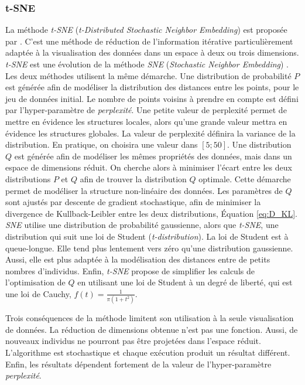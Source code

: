 \subsubsection{t-SNE} \label{subsubsec:tsne}
La méthode \textit{t-SNE} (\textit{t-Distributed Stochastic Neighbor Embedding}) est proposée par \citeauthor{maaten_visualizing_2008} \cite{maaten_visualizing_2008}. C'est une méthode de réduction de l'information itérative particulièrement adaptée à la visualisation des données dans un espace à deux ou trois dimensions.
\textit{t-SNE} est une évolution de la méthode \textit{SNE} (\textit{Stochastic Neighbor Embedding}) \cite{hinton_stochastic_2003}.
Les deux méthodes utilisent la même démarche.
Une distribution de probabilité $P$ est générée afin de modéliser la distribution des distances entre les points, pour le jeu de données initial.
Le nombre de points voisins à prendre en compte est défini par l'hyper-paramètre de \textit{perplexité}.
Une petite valeur de perplexité permet de mettre en évidence les structures locales, alors qu'une grande valeur mettra en évidence les structures globales.
La valeur de perplexité définira la variance de la distribution.
En pratique, on choisira une valeur dans $[5; 50]$.
Une distribution $Q$ est générée afin de modéliser les mêmes propriétés des données, mais dans un espace de dimensions réduit.
On cherche alors à minimiser l'écart entre les deux distributions $P$ et $Q$ afin de trouver la distribution $Q$ optimale.
Cette démarche permet de modéliser la structure non-linéaire des données.
Les paramètres de $Q$ sont ajustés par descente de gradient stochastique, afin de minimiser la divergence de Kullback-Leibler entre les deux distributions, Équation \ref{eq:D_KL}.
\textit{SNE} utilise une distribution de probabilité gaussienne, alors que \textit{t-SNE}, une distribution qui suit une loi de Student (\textit{t-distribution}).
La loi de Student est à queue-longue.
Elle tend plus lentement vers zéro qu'une distribution gaussienne.
Aussi, elle est plus adaptée à la modélisation des distances entre de petits nombres d'individus.
Enfin, \textit{t-SNE} propose de simplifier les calculs de l'optimisation de $Q$ en utilisant une loi de Student à un degré de liberté, qui est une loi de Cauchy, $f(t)=\frac{1}{\pi(1+t^2)}$.

Trois conséquences de la méthode limitent son utilisation à la seule visualisation de données.
La réduction de dimensions obtenue n'est pas une fonction.
Aussi, de nouveaux individus ne pourront pas être projetées dans l'espace réduit.
L'algorithme est stochastique et chaque exécution produit un résultat différent.
Enfin, les résultats dépendent fortement de la valeur de l'hyper-paramètre \textit{perplexité}.


